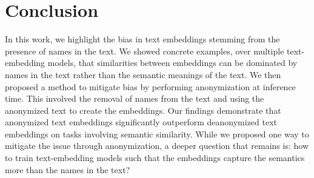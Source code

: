 
\section{Conclusion}
In this work, we highlight the bias in text embeddings stemming from the presence of names in the text. We showed concrete examples, over multiple text-embedding models, that similarities between embeddings can be dominated by names in the text rather than the semantic meanings of the text. We then proposed a method to mitigate bias by performing anonymization at inference time. This involved the removal of names from the text and using the anonymized text to create the embeddings. Our findings demonstrate that anonymized text embeddings significantly outperform deanonymized text embeddings on tasks involving semantic similarity. While we proposed one way to mitigate the issue through anonymization, a deeper question that remains is: how  to train text-embedding models such that the embeddings capture the semantics more than the names in the text? 
